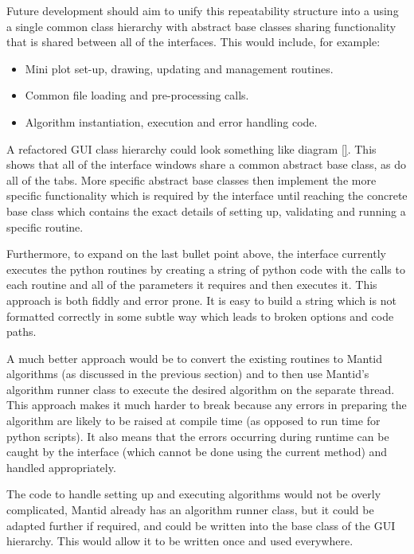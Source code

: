 \documentclass[paper=a4, fontsize=11pt]{scrartcl}	%
\numberwithin{equation}{section}															%
\numberwithin{figure}{section}																%
\numberwithin{table}{section}																%
\begin{document}
Future development should aim to unify this repeatability structure into a using a single common class hierarchy with abstract base classes sharing functionality that is shared between all of the interfaces. This would include, for example:

\begin{itemize}
\item Mini plot set-up, drawing, updating and management routines.
\item Common file loading and pre-processing calls.
\item Algorithm instantiation, execution and error handling code.
\end{itemize}

A refactored GUI class hierarchy could look something like diagram \ref{}. This shows that all of the interface windows share a common abstract base class, as do all of the tabs. More specific abstract base classes then implement the more specific functionality which is required by the interface until reaching the concrete base class which contains the exact details of setting up, validating and running a specific routine.

Furthermore, to expand on the last bullet point above, the interface currently executes the python routines by creating a string of python code with the calls to each routine and all of the parameters it requires and then executes it. This approach is both fiddly and error prone. It is easy to build a string which is not formatted correctly in some subtle way which leads to broken options and code paths.

A much better approach would be to convert the existing routines to Mantid algorithms (as discussed in the previous section) and to then use Mantid's algorithm runner class to execute the desired algorithm on the separate thread. This approach makes it much harder to break because any errors in preparing the algorithm are likely to be raised at compile time (as opposed to run time for python scripts). It also means that the errors occurring during runtime can be caught by the interface (which cannot be done using the current method) and handled appropriately. 

The code to handle setting up and executing algorithms would not be overly complicated, Mantid already has an algorithm runner class, but it could be adapted further if required, and could be written into the base class of the GUI hierarchy. This would allow it to be written once and used everywhere. 
\end{document}
